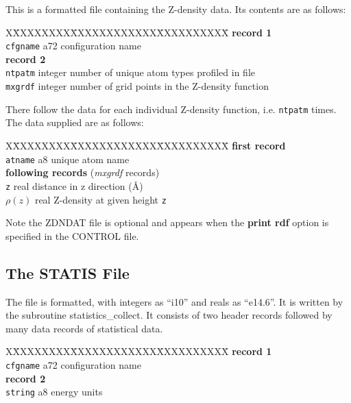 This is a formatted file containing the Z-density data.  Its
contents are as follows:
\begin{tabbing}
X\=XXXXXXXX\=XXXXXXXXXXXX\=XXXXXXXXXX\=\kill
{\bf record 1} \\
\> {\tt cfgname} \> a72    \> configuration name \\
{\bf record 2} \\
\> {\tt ntpatm}  \> integer \> number of unique atom types profiled in file \\
\> {\tt mxgrdf}  \> integer \> number of grid points in the Z-density function \\
\end{tabbing}
There follow the data for each individual Z-density function, i.e.
{\tt ntpatm} times. The data supplied are as follows:
\begin{tabbing}
X\=XXXXXXXX\=XXXXXXXXXXXX\=XXXXXXXXXX\=\kill
{\bf first record} \\
\> {\tt atname}  \> a8      \> unique atom name \\
{\bf following records} ({\em mxgrdf} records) \\
\> {\tt z}       \> real    \> distance in z direction (\AA) \\
\> $\rho(z)$     \> real    \> Z-density at given height {\tt z} \\
\end{tabbing}
Note the ZDNDAT file is optional and appears when the {\bf print
rdf} option is specified in the CONTROL file.

\subsection{The STATIS File}
\label{statis-file}

The file is formatted, with integers as ``i10'' and reals as
``e14.6''.  It is written by the subroutine {\sc
statistics\_collect}.  It consists of two header records followed
by many data records of statistical data.
\begin{tabbing}
X\=XXXXXXXX\=XXXXXXXXXXXX\=XXXXXXXXXX\=\kill
{\bf record 1} \\
\> {\tt cfgname} \> a72 \> configuration name \\
{\bf record 2} \\
\> {\tt string}  \> a8   \> energy units \\
\end{tabbing}

